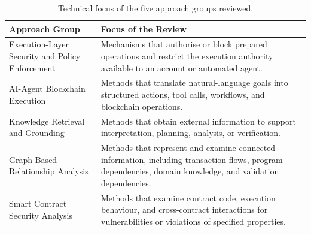 \begin{table}[H]
\centering
\small
\renewcommand{\arraystretch}{1.15}
\begin{tabular}{p{4.8cm} p{9.2cm}}
\hline
\textbf{Approach Group} & \textbf{Focus of the Review} \\
\hline

Execution-Layer Security and Policy Enforcement &
Mechanisms that authorise or block prepared operations and
restrict the execution authority available to an account
or automated agent. \\

AI-Agent Blockchain Execution &
Methods that translate natural-language goals into structured
actions, tool calls, workflows, and blockchain operations. \\

Knowledge Retrieval and Grounding &
Methods that obtain external information to support
interpretation, planning, analysis, or verification. \\

Graph-Based Relationship Analysis &
Methods that represent and examine connected information,
including transaction flows, program dependencies, domain
knowledge, and validation dependencies. \\

Smart Contract Security Analysis &
Methods that examine contract code, execution behaviour,
and cross-contract interactions for vulnerabilities or
violations of specified properties. \\

\hline
\end{tabular}
\caption{Technical focus of the five approach groups reviewed.}
\label{tab:approach_groups}
\end{table}

